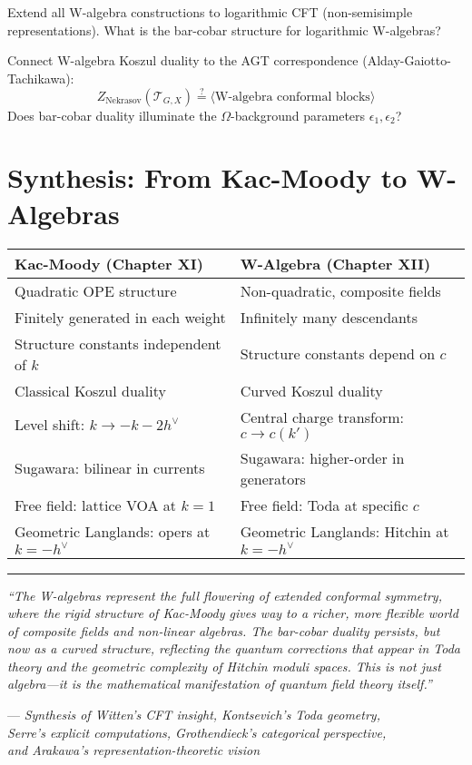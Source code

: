 \begin{openproblem}[5]
Extend all W-algebra constructions to logarithmic CFT (non-semisimple representations). What is the bar-cobar structure for logarithmic W-algebras?
\end{openproblem}

\begin{openproblem}[6]
Connect W-algebra Koszul duality to the AGT correspondence (Alday-Gaiotto-Tachikawa):
$$Z_{\text{Nekrasov}}(\mathcal{T}_{G,X}) \overset{?}{=} \langle \text{W-algebra conformal blocks} \rangle$$
Does bar-cobar duality illuminate the $\Omega$-background parameters $\epsilon_1, \epsilon_2$?
\end{openproblem}

\section{Synthesis: From Kac-Moody to W-Algebras}

\begin{center}
\begin{tabular}{|p{5cm}|p{5cm}|}
\hline
\textbf{Kac-Moody (Chapter XI)} & \textbf{W-Algebra (Chapter XII)} \\
\hline
Quadratic OPE structure & Non-quadratic, composite fields \\
\hline
Finitely generated in each weight & Infinitely many descendants \\
\hline
Structure constants independent of $k$ & Structure constants depend on $c$ \\
\hline
Classical Koszul duality & Curved Koszul duality \\
\hline
Level shift: $k \to -k-2h^\vee$ & Central charge transform: $c \to c(k')$ \\
\hline
Sugawara: bilinear in currents & Sugawara: higher-order in generators \\
\hline
Free field: lattice VOA at $k=1$ & Free field: Toda at specific $c$ \\
\hline
Geometric Langlands: opers at $k=-h^\vee$ & Geometric Langlands: Hitchin at $k=-h^\vee$ \\
\hline
\end{tabular}
\end{center}

\bigskip

\begin{center}
\rule{0.5\textwidth}{0.4pt}

\textit{``The W-algebras represent the full flowering of extended conformal symmetry, where the rigid structure of Kac-Moody gives way to a richer, more flexible world of composite fields and non-linear algebras. The bar-cobar duality persists, but now as a curved structure, reflecting the quantum corrections that appear in Toda theory and the geometric complexity of Hitchin moduli spaces. This is not just algebra—it is the mathematical manifestation of quantum field theory itself.''}

— \textit{Synthesis of Witten's CFT insight, Kontsevich's Toda geometry, \\Serre's explicit computations, Grothendieck's categorical perspective, \\and Arakawa's representation-theoretic vision}
\end{center}